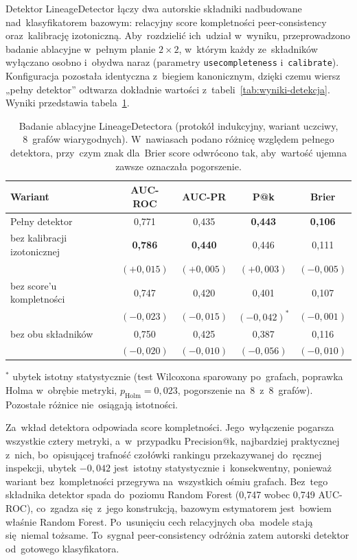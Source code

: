 \documentclass[polish,master,a4paper,oneside]{ppfcmthesis}
\renewcommand{\_}{\origtextunderscore\ifmmode\else\allowbreak\fi}
\begin{document}
Detektor LineageDetector łączy dwa autorskie składniki nadbudowane
nad~klasyfikatorem bazowym: relacyjny score kompletności peer-consistency
oraz~kalibrację izotoniczną. Aby~rozdzielić ich~udział w~wyniku,
przeprowadzono badanie ablacyjne w~pełnym planie $2 \times 2$, w~którym każdy
ze~składników wyłączano osobno i~obydwa naraz (parametry
\texttt{use\_completeness} i~\texttt{calibrate}). Konfiguracja pozostała
identyczna z~biegiem kanonicznym, dzięki czemu wiersz „pełny detektor''
odtwarza dokładnie wartości z~tabeli~\ref{tab:wyniki-detekcja}.
Wyniki przedstawia tabela~\ref{tab:ablacja}.

\begin{table}[ht]
\centering
\caption[Badanie ablacyjne LineageDetectora]{Badanie ablacyjne LineageDetectora (protokół indukcyjny, wariant
uczciwy, 8~grafów wiarygodnych). W~nawiasach podano różnicę względem
pełnego detektora, przy~czym znak dla~Brier score odwrócono tak, aby~wartość ujemna
zawsze oznaczała pogorszenie.}
\label{tab:ablacja}
\small
\begin{tabular}{lcccc}
\toprule
\textbf{Wariant} & \textbf{AUC-ROC} & \textbf{AUC-PR} & \textbf{P@k} & \textbf{Brier} \\
\midrule
Pełny detektor & 0{,}771 & 0{,}435 & \textbf{0{,}443} & \textbf{0{,}106} \\
\midrule
bez kalibracji izotonicznej
  & \textbf{0{,}786} & \textbf{0{,}440} & 0{,}446 & 0{,}111 \\
  & \small$(+0{,}015)$ & \small$(+0{,}005)$ & \small$(+0{,}003)$ & \small$(-0{,}005)$ \\
bez score'u kompletności
  & 0{,}747 & 0{,}420 & 0{,}401 & 0{,}107 \\
  & \small$(-0{,}023)$ & \small$(-0{,}015)$ & \small$(-0{,}042)^{*}$ & \small$(-0{,}001)$ \\
bez obu składników
  & 0{,}750 & 0{,}425 & 0{,}387 & 0{,}116 \\
  & \small$(-0{,}020)$ & \small$(-0{,}010)$ & \small$(-0{,}056)$ & \small$(-0{,}010)$ \\
\bottomrule
\end{tabular}

\vspace{0.5em}
\footnotesize $^{*}$ ubytek istotny statystycznie (test Wilcoxona sparowany
po~grafach, poprawka Holma w~obrębie metryki, $p_{\mathrm{Holm}} = 0{,}023$,
pogorszenie na~8~z~8~grafów). Pozostałe różnice nie~osiągają istotności.
\end{table}

Za~wkład detektora odpowiada score kompletności. Jego~wyłączenie pogarsza
wszystkie cztery metryki, a~w~przypadku Precision@k, najbardziej praktycznej
z~nich, bo~opisującej trafność czołówki rankingu przekazywanej do~ręcznej
inspekcji, ubytek $-0{,}042$ jest~istotny statystycznie i~konsekwentny,
ponieważ wariant bez~kompletności przegrywa na~wszystkich ośmiu grafach.
Bez~tego składnika detektor spada do~poziomu Random Forest (0{,}747 wobec
0{,}749 AUC-ROC), co~zgadza się~z~jego konstrukcją, bazowym estymatorem
jest~bowiem właśnie Random Forest. Po~usunięciu cech relacyjnych oba~modele
stają się~niemal tożsame. To~sygnał peer-consistency odróżnia zatem autorski
detektor od~gotowego klasyfikatora.
\end{document}
